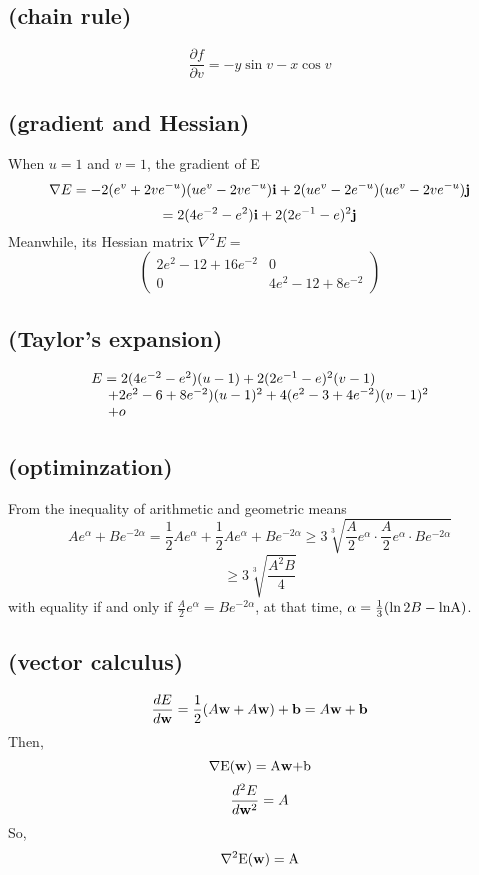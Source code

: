\documentclass[8pt,a4paper]{exam}
\begin{document}
\subsection{(chain rule)}
\[\frac{{\partial f}}{{\partial v}} =  - y\sin v - x\cos v\]
\subsection{(gradient and Hessian)}
When $u=1$ and $v=1$, the gradient of E
\[\nabla E = -2({e^v} + 2v{e^{ - u}})(u{e^v} - 2v{e^{ - u}}){\bf{i}} + 2(u{e^v} - 2{e^{ - u}})(u{e^v} - 2v{e^{ - u}}){\bf{j}}\]
\[ = 2(4{e^{ - 2}} - {e^2}){\bf{i}} + 2{(2{e^{ - 1}} - e)^2}{\bf{j}}\]
\indent Meanwhile, its Hessian matrix ${\nabla ^2}E = $
\[\left( {\begin{array}{*{20}{c}}
	{2{e^2} - 12 + 16{e^{ - 2}}}&0\\
	0&{4{e^2} - 12 + 8{e^{ - 2}}}
	\end{array}} \right)\]
\subsection{(Taylor's expansion)}
\[\begin{array}{l}
E = 2(4{e^{ - 2}} - {e^2})(u - 1) + 2{(2{e^{ - 1}} - e)^2}(v - 1)\\
{\kern 1pt} {\kern 1pt} {\kern 1pt} {\kern 1pt} {\kern 1pt} {\kern 1pt} {\kern 1pt} {\kern 1pt} {\kern 1pt} {\kern 1pt} {\kern 1pt} {\kern 1pt} {\rm{ + }}2{e^2} - 6 + 8{e^{ - 2}}){(u - 1)^2} + 4({e^2} - 3 + 4{e^{ - 2}}){(v - 1)^2}\\
{\kern 1pt} {\kern 1pt} {\kern 1pt} {\kern 1pt} {\kern 1pt} {\kern 1pt} {\kern 1pt} {\kern 1pt} {\kern 1pt} {\kern 1pt} {\kern 1pt} {\kern 1pt} {\rm{ + }}o
\end{array}\]
\subsection{(optiminzation)}
From the inequality of arithmetic and geometric means
\[A{e^\alpha } + B{e^{ - 2\alpha }} = \frac{1}{2}A{e^\alpha } + \frac{1}{2}A{e^\alpha } + B{e^{ - 2\alpha }} \ge 3\sqrt[3]{{\frac{A}{2}{e^\alpha } \cdot \frac{A}{2}{e^\alpha } \cdot B{e^{ - 2\alpha }}}}\]
\[ \ge 3\sqrt[3]{{\frac{{{A^2}B}}{4}}}\]
\indent with equality if and only if  $\frac{A}{2}{e^\alpha } = B{e^{ - 2\alpha }}$, at that time, $\alpha  = \frac{1}{3}(\ln 2B - {\mathop{\rm lnA}\nolimits} )$.
\subsection{(vector calculus)}
\[\frac{{dE}}{{d{\bf{w}}}} = \frac{1}{2}(A{\bf{w}} + A{\bf{w}}) + {\bf{b}} = A{\bf{w}} + {\bf{b}}\]
Then,
\[\nabla {\rm{E(}}{\bf{w}}{\rm{)  =  A}}{\bf{w}}{\rm{  +  b}}\]
\[\frac{{{d^2}E}}{{d{{\bf{w}}^2}}} = A\]
So,
\[{\nabla ^2}{\rm{E(}}{\bf{w}}{\rm{)  =  A}}\]
\end{document}
